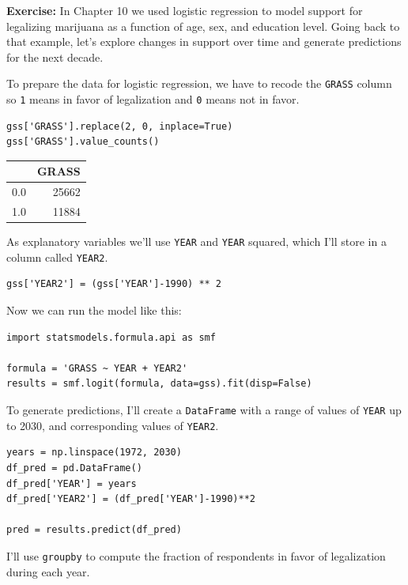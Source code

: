 \textbf{Exercise:} In Chapter 10 we used logistic regression to model
support for legalizing marijuana as a function of age, sex, and
education level. Going back to that example, let's explore changes in
support over time and generate predictions for the next decade.

To prepare the data for logistic regression, we have to recode the
\passthrough{\lstinline!GRASS!} column so \passthrough{\lstinline!1!}
means in favor of legalization and \passthrough{\lstinline!0!} means not
in favor.

\begin{lstlisting}[]
gss['GRASS'].replace(2, 0, inplace=True)
gss['GRASS'].value_counts()
\end{lstlisting}

\begin{tabular}{lr}
\midrule
{} &  GRASS \\
\midrule
0.0 &  25662 \\
1.0 &  11884 \\
\midrule
\end{tabular}

As explanatory variables we'll use \passthrough{\lstinline!YEAR!} and
\passthrough{\lstinline!YEAR!} squared, which I'll store in a column
called \passthrough{\lstinline!YEAR2!}.

\begin{lstlisting}[]
gss['YEAR2'] = (gss['YEAR']-1990) ** 2
\end{lstlisting}

Now we can run the model like this:

\begin{lstlisting}[]
import statsmodels.formula.api as smf

formula = 'GRASS ~ YEAR + YEAR2'
results = smf.logit(formula, data=gss).fit(disp=False)
\end{lstlisting}

To generate predictions, I'll create a
\passthrough{\lstinline!DataFrame!} with a range of values of
\passthrough{\lstinline!YEAR!} up to 2030, and corresponding values of
\passthrough{\lstinline!YEAR2!}.

\begin{lstlisting}[]
years = np.linspace(1972, 2030)
df_pred = pd.DataFrame()
df_pred['YEAR'] = years
df_pred['YEAR2'] = (df_pred['YEAR']-1990)**2

pred = results.predict(df_pred)
\end{lstlisting}

I'll use \passthrough{\lstinline!groupby!} to compute the fraction of
respondents in favor of legalization during each year.

